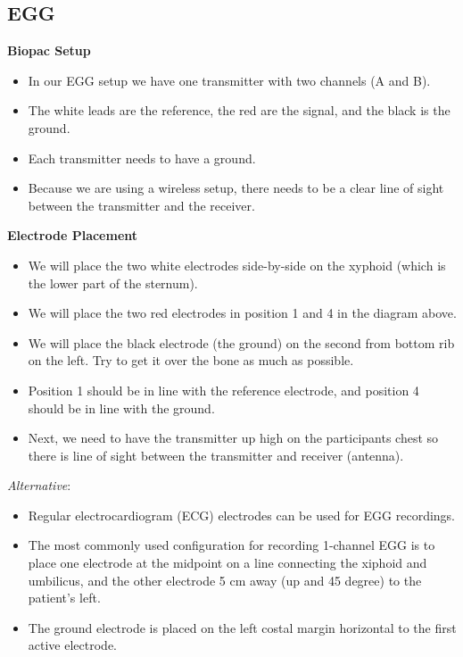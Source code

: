 \documentclass[
]{book}
\providecommand{\tightlist}{%
  \setlength{\itemsep}{0pt}\setlength{\parskip}{0pt}}
\begin{document}
\hypertarget{egg}{%
\subsection{EGG}\label{egg}}

\textbf{Biopac Setup}

\begin{itemize}
\tightlist
\item
  In our EGG setup we have one transmitter with two channels (A and B).
\item
  The white leads are the reference, the red are the signal, and the black is the ground.
\item
  Each transmitter needs to have a ground.
\item
  Because we are using a wireless setup, there needs to be a clear line of sight between the transmitter and the receiver.
\end{itemize}

\textbf{Electrode Placement}

\begin{itemize}
\tightlist
\item
  We will place the two white electrodes side-by-side on the xyphoid (which is the lower part of the sternum).
\item
  We will place the two red electrodes in position 1 and 4 in the diagram above.
\item
  We will place the black electrode (the ground) on the second from bottom rib on the left. Try to get it over the bone as much as possible.
\item
  Position 1 should be in line with the reference electrode, and position 4 should be in line with the ground.
\item
  Next, we need to have the transmitter up high on the participants chest so there is line of sight between the transmitter and receiver (antenna).
\end{itemize}

\emph{Alternative}:

\begin{itemize}
\tightlist
\item
  Regular electrocardiogram (ECG) electrodes can be used for EGG recordings.
\item
  The most commonly used configuration for recording 1-channel EGG is to place one electrode at the midpoint on a line connecting the xiphoid and umbilicus, and the other electrode 5 cm away (up and 45 degree) to the patient's left.
\item
  The ground electrode is placed on the left costal margin horizontal to the first active electrode.
\end{itemize}
\end{document}
